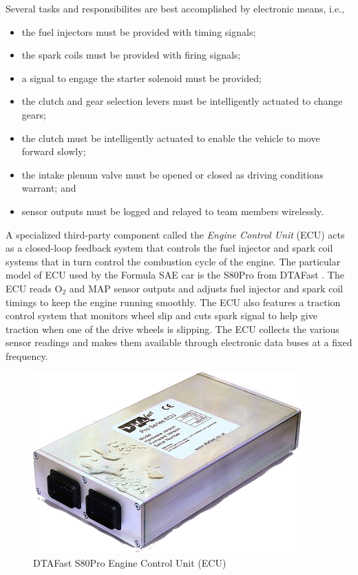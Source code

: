 Several tasks and responsibilites are best accomplished by electronic means, i.e.,

\begin{itemize}
\item the fuel injectors must be provided with timing signals;
\item the spark coils must be provided with firing signals;
\item a signal to engage the starter solenoid must be provided;
\item the clutch and gear selection levers must be intelligently actuated to change gears; 
\item the clutch must be intelligently actuated to enable the vehicle to move forward slowly;
\item the intake plenum valve must be opened or closed as driving conditions warrant; and
\item sensor outputs must be logged and relayed to team members wirelessly.
\end{itemize}

A specialized third-party component called the \emph{Engine Control Unit} (ECU) acts as a 
closed-loop feedback system that controls the fuel injector and spark coil systems that
in turn control the combustion cycle of the engine. The particular model of ECU used by the 
Formula SAE car is the S80Pro from DTAFast \cite{s60pro}. The ECU reads O$_{2}$ and MAP sensor
outputs and adjusts fuel injector and spark coil timings to keep the engine running smoothly. 
The ECU also features a traction control system that monitors wheel slip and cuts spark signal 
to help give traction when one of the drive wheels is slipping. The ECU collects the various sensor 
readings and makes them available through electronic data buses at a fixed frequency. 

\begin{figure}[H]
	\centering
	 	\includegraphics[scale=0.5]{figures/s80.png}
    \caption{DTAFast S80Pro Engine Control Unit (ECU)}
    \label{fig:s80pro_product}
\end{figure}

